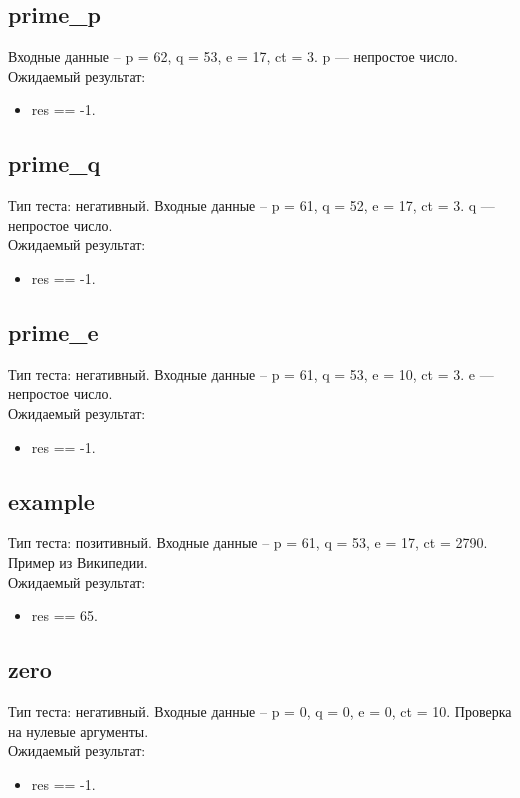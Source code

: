 \documentclass{article}
\begin{document}
\subsection{prime\_p}
Входные данные -- p = 62, q = 53, e = 17, ct = 3. p --- непростое число.\\
Ожидаемый результат: 
\begin{itemize}
    \item res == -1. 
\end{itemize}

\subsection{prime\_q}
Тип теста: негативный.
Входные данные -- p = 61, q = 52, e = 17, ct = 3. q --- непростое число.\\
Ожидаемый результат: 
\begin{itemize}
    \item res == -1. 
\end{itemize}

\subsection{prime\_e}
Тип теста: негативный.
Входные данные -- p = 61, q = 53, e = 10, ct = 3. e --- непростое число.\\
Ожидаемый результат: 
\begin{itemize}
    \item res == -1. 
\end{itemize}

\subsection{example}
Тип теста: позитивный.
Входные данные -- p = 61, q = 53, e = 17, ct = 2790. Пример из Википедии.\\
Ожидаемый результат: 
\begin{itemize}
    \item res == 65. 
\end{itemize}

\subsection{zero}
Тип теста: негативный.
Входные данные -- p = 0, q = 0, e = 0, ct = 10. Проверка на нулевые аргументы.\\
Ожидаемый результат: 
\begin{itemize}
    \item res == -1. 
\end{itemize}
\end{document}
